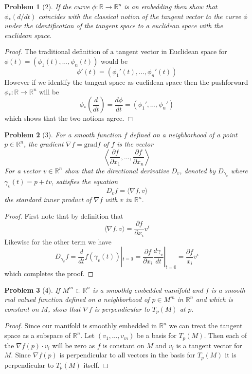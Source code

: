 \documentclass[10pt]{article}
\newcommand{\sk}{\vskip 10mm}
\newcommand{\bb}[1]{\mathbb{#1}}
\theoremstyle{plain}
\newtheorem{problem}{Problem}
\theoremstyle{remark}
\begin{document}
\begin{problem}[2]
  If the curve $\phi:\bb{R}\rightarrow\bb{R}^n$ is an embedding then show that
  $\phi_*(d/dt)$ coincides with the classical notion of the tangent
  vector to the curve $\phi$ under the identification of the tangent
  space to a euclidean space with the euclidean space.
\end{problem}

\begin{proof}
  The traditional definition of a tangent vector in Euclidean space
  for $\phi(t)=(\phi_1(t),\ldots,\phi_n(t))$ would be
  \[
    \phi'(t)=(\phi_1'(t),\ldots,\phi_n'(t))
  \]
  However if we identify the tangent space as euclidean space
  then the pushforward $\phi_*:\bb{R}\rightarrow\bb{R}^n$ will be
  \[
    \phi_*\left(\frac{d}{dt}\right)=\frac{d\phi}{dt}=(\phi_1',\ldots,\phi_n')
  \]
  which shows that the two notions agree.
\end{proof}

\sk

\begin{problem}[3]
  For a smooth function $f$ defined on a neighborhood of a point
  $p\in \bb{R}^n$, the gradient $\nabla f=\mathrm{grad}f$ of $f$ is the vector
  \[
    \left\langle
      \frac{\partial f}{\partial x_1},\ldots,\frac{\partial f}{\partial x_n}
    \right\rangle
  \]
  For a vector $v\in\bb{R}^n$ show that the directional derivative $D_v$,
  denoted by $D_{\gamma_v}$ where $\gamma_v(t)=p+tv$, satisfies the equation
  \[
    D_vf =\langle \nabla f,v\rangle
  \]
  the standard inner product of $\nabla f$ with $v$ in $\bb{R}^n$.
\end{problem}

\begin{proof}
  First note that by definition that
  \[
    \langle \nabla f,v\rangle=\frac{\partial f}{\partial x_i}v^i
  \]
  Likewise for the other term we have
  \[
    D_{\gamma_v}f=\frac{d}{dt}f(\gamma_v(t))|_{t=0}=\frac{\partial f}{\partial x_i}\frac{d\gamma_v}{dt}|_{t=0}=\frac{\partial f}{x_i}v^i
  \]
  which completes the proof.
\end{proof}

\sk

\begin{problem}[4]
  If $M^m\subset\bb{R}^n$ is a smoothly embedded manifold and $f$
  is a smooth real valued function defined on a neighborhood of
  $p\in M^m$ in $\bb{R}^n$ and which is constant on $M$, show that $\nabla f$
  is perpendicular to $T_p(M)$ at $p$.
\end{problem}

\begin{proof}
  Since our manifold is smoothly embedded in $\bb{R}^n$ we can treat
  the tangent space as a subspace of $\bb{R}^n$. Let $(v_1,\ldots,v_m)$
  be a basis for $T_p(M)$. Then each of the $\nabla f(p)\cdot v_i$ will be
  zero as $f$ is constant on $M$ and $v_i$ is a tangent vector for
  $M$. Since $\nabla f(p)$ is perpendicular to all vectors in the basis
  for $T_p(M)$ it is perpendicular to $T_p(M)$ itself.
\end{proof}

\sk

\end{document}
